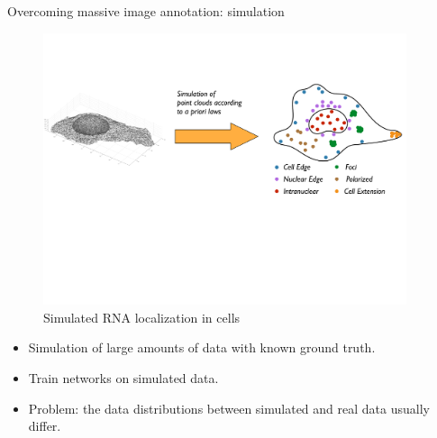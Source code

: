 \documentclass[xcolor=pdftex,dvipsnames,table]{beamer}
\begin{document}
\begin{frame}{Overcoming massive image annotation: simulation}
\begin{figure}[htb]
   \centering
   \includegraphics[width=0.95\textwidth]{../graphics/data_simulation.pdf}
   \caption{Simulated RNA localization in cells}
\end{figure}
\begin{itemize}
   \item Simulation of large amounts of data with known ground truth. 
   \item Train networks on simulated data.
   \item Problem: the data distributions between simulated and real data usually differ. 
\end{itemize}
\end{frame}
\end{document}
